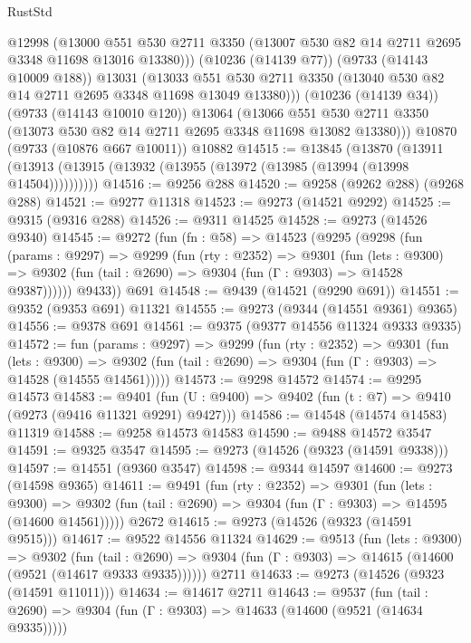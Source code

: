 \begin{lexlean}{RustStd}
\begin{coremodule}
          @12998
          (@13000
            @551
            @530
            @2711
            @3350
            (@13007 @530 @82 @14 @2711 @2695 @3348 @11698 @13016 @13380)))
        (@10236 (@14139 @77))
        (@9733 (@14143 @10009 @188))
        @13031
        (@13033 @551 @530 @2711 @3350 (@13040 @530 @82 @14 @2711 @2695 @3348 @11698 @13049 @13380)))
      (@10236 (@14139 @34))
      (@9733 (@14143 @10010 @120))
      @13064
      (@13066 @551 @530 @2711 @3350 (@13073 @530 @82 @14 @2711 @2695 @3348 @11698 @13082 @13380)))
    @10870
    (@9733 (@10876 @667 @10011))
    @10882
@14515 := @13845
    (@13870 (@13911 (@13913 (@13915 (@13932 (@13955 (@13972 (@13985 (@13994 (@13998 @14504))))))))))
@14516 := @9256 @288
@14520 := @9258 (@9262 @288) (@9268 @288)
@14521 := @9277 @11318
@14523 := @9273 (@14521 @9292)
@14525 := @9315 (@9316 @288)
@14526 := @9311 @14525
@14528 := @9273 (@14526 @9340)
@14545 := @9272
    (fun (fn : @58) =>
    @14523
      (@9295
        (@9298
          (fun (params : @9297) =>
          @9299
            (fun (rty : @2352) =>
            @9301
              (fun (lets : @9300) =>
              @9302 (fun (tail : @2690) => @9304 (fun (Γ : @9303) => @14528 @9387))))))
        @9433))
    @691
@14548 := @9439 (@14521 (@9290 @691))
@14551 := @9352 (@9353 @691) @11321
@14555 := @9273 (@9344 (@14551 @9361) @9365)
@14556 := @9378 @691
@14561 := @9375 (@9377 @14556 @11324 @9333 @9335)
@14572 := fun (params : @9297) =>
  @9299
    (fun (rty : @2352) =>
    @9301
      (fun (lets : @9300) =>
      @9302 (fun (tail : @2690) => @9304 (fun (Γ : @9303) => @14528 (@14555 @14561)))))
@14573 := @9298 @14572
@14574 := @9295 @14573
@14583 := @9401
    (fun (U : @9400) => @9402 (fun (t : @7) => @9410 (@9273 (@9416 @11321 @9291) @9427)))
@14586 := @14548 (@14574 @14583) @11319
@14588 := @9258 @14573 @14583
@14590 := @9488 @14572 @3547
@14591 := @9325 @3547
@14595 := @9273 (@14526 (@9323 (@14591 @9338)))
@14597 := @14551 (@9360 @3547)
@14598 := @9344 @14597
@14600 := @9273 (@14598 @9365)
@14611 := @9491
    (fun (rty : @2352) =>
    @9301
      (fun (lets : @9300) =>
      @9302 (fun (tail : @2690) => @9304 (fun (Γ : @9303) => @14595 (@14600 @14561)))))
    @2672
@14615 := @9273 (@14526 (@9323 (@14591 @9515)))
@14617 := @9522 @14556 @11324
@14629 := @9513
    (fun (lets : @9300) =>
    @9302
      (fun (tail : @2690) =>
      @9304 (fun (Γ : @9303) => @14615 (@14600 (@9521 (@14617 @9333 @9335))))))
    @2711
@14633 := @9273 (@14526 (@9323 (@14591 @11011)))
@14634 := @14617 @2711
@14643 := @9537
    (fun (tail : @2690) => @9304 (fun (Γ : @9303) => @14633 (@14600 (@9521 (@14634 @9335)))))

\end{coremodule}
\end{lexlean}
